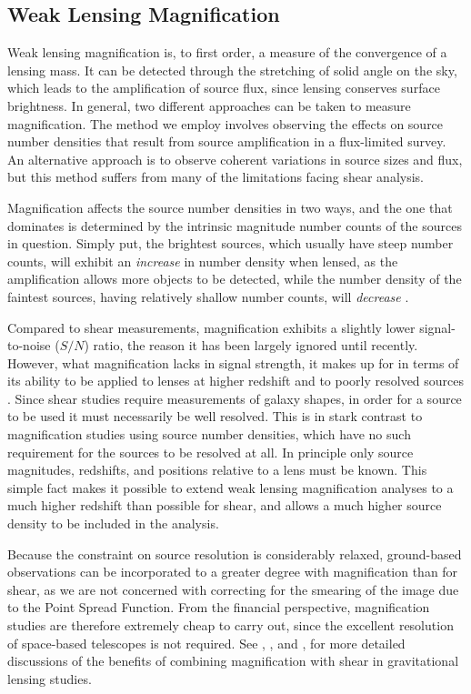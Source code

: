 \subsection{Weak Lensing Magnification}
\label{sec:Mag}
Weak lensing magnification is, to first order, a measure of the convergence of a lensing mass.  It can be detected through the stretching of solid angle on the sky, which leads to the amplification of source flux, since lensing conserves surface brightness. In general, two different approaches can be taken to measure magnification.  The method we employ involves observing the effects on source number densities that result from source amplification in a flux-limited survey. An alternative approach is to observe coherent variations in source sizes and flux, but this method suffers from many of the limitations facing shear analysis.

Magnification affects the source number densities in two ways, and the one that dominates is determined by the intrinsic magnitude number counts of the sources in question.  Simply put, the brightest sources, which usually have steep number counts, will exhibit an {\it increase} in number density when lensed, as the amplification allows more objects to be detected, while the number density of the faintest sources, having relatively shallow number counts, will {\it decrease} \citep{Narayan89}.

Compared to shear measurements, magnification exhibits a slightly lower signal-to-noise ($S/N$) ratio, the reason it has been largely ignored until recently.  However, what magnification lacks in signal strength, it makes up for in terms of its ability to be applied to lenses at higher redshift and to poorly resolved sources \citep{Waerbeke10}.  Since shear studies require measurements of galaxy shapes, in order for a source to be used it must necessarily be well resolved.  This is in stark contrast to magnification studies using source number densities, which have no such requirement for the sources to be resolved at all.  In principle only source magnitudes, redshifts, and positions relative to a lens must be known.  This simple fact makes it possible to extend weak lensing magnification analyses to a much higher redshift than possible for shear, and allows a much higher source density to be included in the analysis.  

Because the constraint on source resolution is considerably relaxed, ground-based observations can be incorporated to a greater degree with magnification than for shear, as we are not concerned with correcting for the smearing of the image due to the Point Spread Function. From the financial perspective, magnification studies are therefore extremely cheap to carry out, since the excellent resolution of space-based telescopes is not required. See \citet{Waerbeke10}, \citet{RozoSchmidt10}, and \citet{Umetsu11}, for more detailed discussions of the benefits of combining magnification with shear in gravitational lensing studies.

